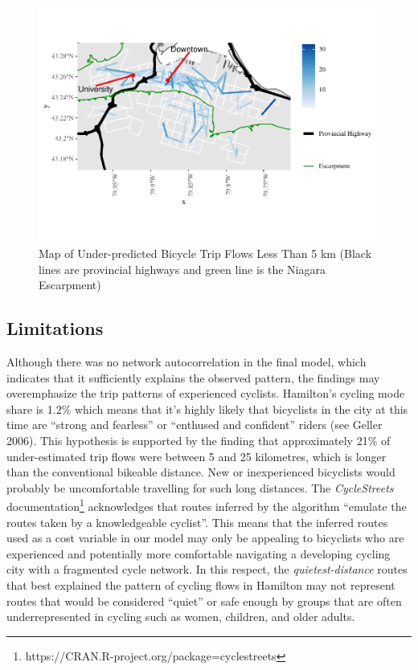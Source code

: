 \documentclass[smallextended]{svjour3}       %
\begin{document}
\begin{figure}
\centering
\includegraphics{Correlates-cycling-flows-routes_files/figure-latex/residuals-under-5km-1.pdf}
\caption{\label{fig:residuals-under-5km} Map of Under-predicted Bicycle
Trip Flows Less Than 5 km (Black lines are provincial highways and green
line is the Niagara Escarpment)}
\end{figure}

\hypertarget{limitations}{%
\subsection{Limitations}\label{limitations}}

Although there was no network autocorrelation in the final model, which
indicates that it sufficiently explains the observed pattern, the
findings may overemphasize the trip patterns of experienced cyclists.
Hamilton's cycling mode share is 1.2\% which means that it's highly
likely that bicyclists in the city at this time are ``strong and
fearless'' or ``enthused and confident'' riders (see Geller 2006). This
hypothesis is supported by the finding that approximately 21\% of
under-estimated trip flows were between 5 and 25 kilometres, which is
longer than the conventional bikeable distance. New or inexperienced
bicyclists would probably be uncomfortable travelling for such long
distances. The \emph{CycleStreets}
documentation\footnote{https://CRAN.R-project.org/package=cyclestreets}
acknowledges that routes inferred by the algorithm ``emulate the routes
taken by a knowledgeable cyclist''. This means that the inferred routes
used as a cost variable in our model may only be appealing to bicyclists
who are experienced and potentially more comfortable navigating a
developing cycling city with a fragmented cycle network. In this
respect, the \emph{quietest-distance} routes that best explained the
pattern of cycling flows in Hamilton may not represent routes that would
be considered ``quiet'' or safe enough by groups that are often
underrepresented in cycling such as women, children, and older adults.
\end{document}
